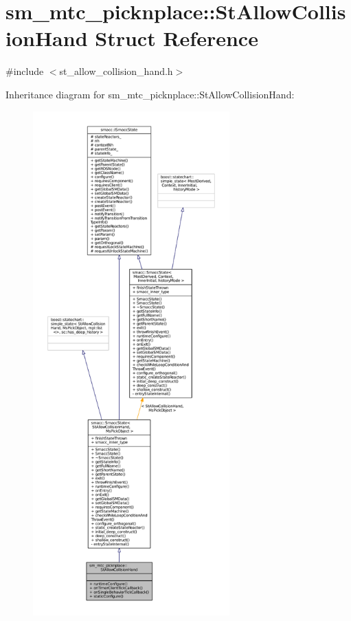 \hypertarget{structsm__mtc__picknplace_1_1StAllowCollisionHand}{}\section{sm\+\_\+mtc\+\_\+picknplace\+:\+:St\+Allow\+Collision\+Hand Struct Reference}
\label{structsm__mtc__picknplace_1_1StAllowCollisionHand}


{\ttfamily \#include $<$st\+\_\+allow\+\_\+collision\+\_\+hand.\+h$>$}



Inheritance diagram for sm\+\_\+mtc\+\_\+picknplace\+:\+:St\+Allow\+Collision\+Hand\+:
\nopagebreak
\begin{figure}[H]
\begin{center}
\leavevmode
\includegraphics[height=550pt]{structsm__mtc__picknplace_1_1StAllowCollisionHand__inherit__graph}
\end{center}
\end{figure}


